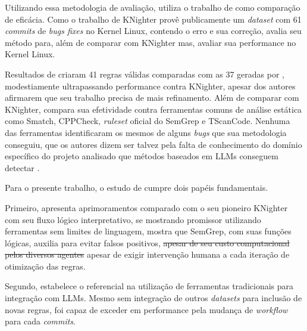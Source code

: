 \documentclass[
    12pt,                %
    openright,           %
    oneside,             %
    a4paper,             %
    english,             %
    brazil               %
]{abntex2}
\newcommand{\antigo}[1]{\sout{#1}}
\newcommand{\novo}[1]{{\color{red}#1}}
\begin{document}
\par
Utilizando essa metodologia de avaliação,  utiliza o trabalho de  como comparação de eficácia.
Como o trabalho de KNighter provê publicamente um \textit{dataset} com 61 \textit{commits} de \textit{bugs fixes} no Kernel Linux, contendo o erro e sua correção,  avalia seu método para, além de comparar com KNighter mas, avaliar sua performance no Kernel Linux.
\par
Resultados de  criaram 41 regras válidas comparadas com as 37 geradas por , modestiamente ultrapassando performance contra KNighter, apesar dos autores afirmarem que seu trabalho precisa de mais refinamento. 
Além de comparar com KNighter,  compara sua efetividade contra ferramentas comuns de análise estática como Smatch, CPPCheck, \textit{ruleset} oficial do SemGrep e TScanCode.
Nenhuma das ferramentas identificaram os mesmos de alguns \textit{bugs} que sua metodologia conseguiu, que os autores dizem ser talvez pela falta de conhecimento do domínio específico do projeto analisado que métodos baseados em LLMs conseguem detectar \cite{hou2025generation}. 
\par
Para o presente trabalho, o estudo de  cumpre dois papéis fundamentais.
\par
Primeiro, apresenta aprimoramentos comparado com o seu pioneiro KNighter com seu fluxo lógico interpretativo, se mostrando promissor utilizando ferramentas sem limites de linguagem,  mostra que SemGrep, com suas funções lógicas, auxilia para evitar falsos positivos, \antigo{apesar de seu custo computacional pelos diversos agentes} \novo{apesar de exigir intervenção humana a cada iteração de otimização das regras}.
\par
Segundo, estabelece o referencial na utilização de ferramentas tradicionais para integração com LLMs.
Mesmo sem integração de outros \textit{datasets} para inclusão de novas regras,  foi capaz de exceder em performance pela mudança de \textit{workflow} para cada \textit{commits}.
\end{document}
